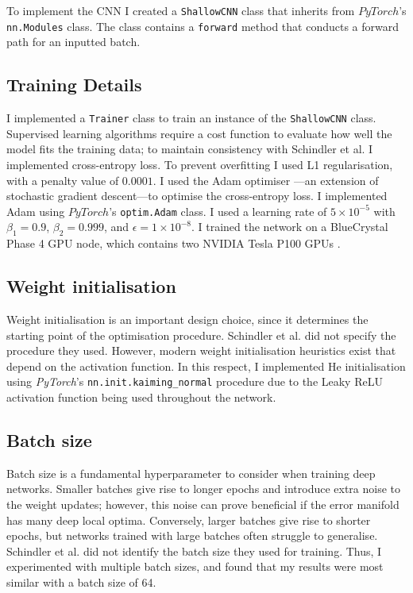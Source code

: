 \documentclass[conference]{IEEEtran}
\begin{document}
To implement the CNN I created a \texttt{ShallowCNN} class that inherits from $PyTorch$'s \texttt{nn.Modules} class.
The class contains a \texttt{forward} method that conducts a forward path for an inputted batch.

\subsection{Training Details}

I implemented a \texttt{Trainer} class to train an instance of the \texttt{ShallowCNN} class.
Supervised learning algorithms require a cost function to evaluate how well the model fits the training data; to maintain consistency with Schindler et al. I implemented cross-entropy loss.
To prevent overfitting I used L1 regularisation, with a penalty value of $0.0001$.
I used the Adam optimiser \cite{KingmaBa}---an extension of stochastic gradient descent---to optimise the cross-entropy loss.
I implemented Adam using $PyTorch$'s \texttt{optim.Adam} class.
I used a learning rate of $5\times10^{-5}$ with $\beta_1=0.9$, $\beta_2=0.999$, and $\epsilon=1\times10^{-8}$.
I trained the network on a BlueCrystal Phase 4 GPU node, which contains two NVIDIA Tesla P100 GPUs \cite{bc4}.

\subsection{Weight initialisation}

Weight initialisation is an important design choice, since it determines the starting point of the optimisation procedure.
Schindler et al. did not specify the procedure they used.
However, modern weight initialisation heuristics exist that depend on the activation function.
In this respect, I implemented He initialisation using \textit{PyTorch}'s \texttt{nn.init.kaiming\_normal} procedure due to the Leaky ReLU activation function being used throughout the network.

\subsection{Batch size}

Batch size is a fundamental hyperparameter to consider when training deep networks.
Smaller batches give rise to longer epochs and introduce extra noise to the weight updates; however, this noise can prove beneficial if the error manifold has many deep local optima.
Conversely, larger batches give rise to shorter epochs, but networks trained with large batches often struggle to generalise.
Schindler et al. did not identify the batch size they used for training.
Thus, I experimented with multiple batch sizes, and found that my results were most similar with a batch size of 64.
\end{document}
